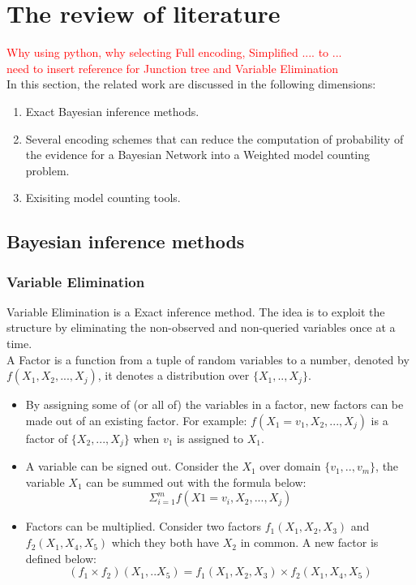 \newpage
\section{The review of literature}
\textcolor{red}{Why using python, why selecting Full encoding, Simplified .... to ...\\
need to insert reference for Junction tree and Variable Elimination}\\
In this section, the related work are discussed in the following dimensions:
\begin{enumerate}
    \item Exact Bayesian inference methods.
    \item Several encoding schemes that can reduce the computation of probability of the evidence for a Bayesian Network into a Weighted model counting problem. 
    \item Exisiting model counting tools.
\end{enumerate}

    \subsection{Bayesian inference methods}
        \subsubsection{Variable Elimination}
        Variable Elimination is a Exact inference method. The idea is to exploit the structure by eliminating the non-observed and non-queried variables once at a time.\\
        
        A Factor is a function from a tuple of random variables to a number, denoted by $f(X_{1}, X_{2}, ... , X_{j})$, it denotes a distribution over $\{X_{1}, .., X_{j}\}$. 
        \begin{itemize}
            \item  By assigning some of (or all of) the variables in a factor, new factors can be made out of an existing factor. For example: $f(X_{1} = v_{1}, X_{2}, ..., X_{j})$ is a factor of $\{X_{2}, ... , X_{j}\}$ when $v_{1}$ is assigned to $X_{1}$.
            \item A variable can be signed out. Consider the $X_{1}$ over domain $\{v_{1}, .. ,v_{m}\}$, the variable $X_{1}$ can be summed out with the formula below: $$\Sigma_{i= 1}^{m}f(X1 = v_{i}, X_{2}, ..., X_{j})$$
            \item Factors can be multiplied. Consider two factors $f_{1}(X_{1}, X_{2}, X_{3})$ and $f_{2}(X_{1}, X_{4}, X_{5})$ which they both have $X_{2}$ in common. A new factor is defined below: $$(f_{1} \times f_{2})(X_{1}, .. X_{5}) = f_{1}(X_{1}, X_{2}, X_{3}) \times f_{2}(X_{1}, X_{4}, X_{5}) $$
        \end{itemize}
        
